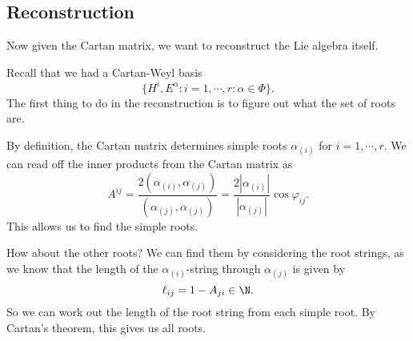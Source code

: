 \documentclass[a4paper]{article}
\begin{document}
\subsection{Reconstruction}
Now given the Cartan matrix, we want to reconstruct the Lie algebra itself.

Recall that we had a Cartan-Weyl basis
\[
  \{H^i, E^\alpha: i = 1, \cdots, r: \alpha \in \Phi\}.
\]
The first thing to do in the reconstruction is to figure out what the set of roots are.

By definition, the Cartan matrix determines simple roots $\alpha_{(i)}$ for $i = 1, \cdots, r$. We can read off the inner products from the Cartan matrix as
\[
  A^{ij} = \frac{2(\alpha_{(i)}, \alpha_{(j)})}{(\alpha_{(j)}, \alpha_{(j)})} = \frac{2|\alpha_{(i)}|}{|\alpha_{(j)}|} \cos \varphi_{ij}.
\]
This allows us to find the simple roots.

How about the other roots? We can find them by considering the root strings, as we know that the length of the $\alpha_{(i)}$-string through $\alpha_{(j)}$ is given by
\[
  \ell_{ij} = 1 - A_{ji} \in \N.
\]
So we can work out the length of the root string from each simple root. By Cartan's theorem, this gives us all roots.
\end{document}
